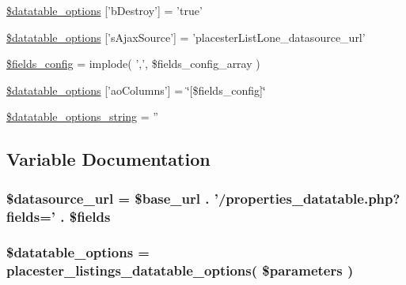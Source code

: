 \begin{DoxyCompactItemize}
\item 
\hyperlink{listings__list__lone__datatable_8php_aede299d9dc457bade42b03cb0e016767}{\$datatable\_\-options} \mbox{[}'bDestroy'\mbox{]} = 'true'
\item 
\hyperlink{listings__list__lone__datatable_8php_a44a3028e9b238ad6fa888ce5b1146630}{\$datatable\_\-options} \mbox{[}'sAjaxSource'\mbox{]} = 'placesterListLone\_\-datasource\_\-url'
\item 
\hyperlink{listings__list__lone__datatable_8php_aa814c93531f3211027d14b81e333f67e}{\$fields\_\-config} = implode( ',', \$fields\_\-config\_\-array )
\item 
\hyperlink{listings__list__lone__datatable_8php_a2022ba2609adb229b6169ded377ff005}{\$datatable\_\-options} \mbox{[}'aoColumns'\mbox{]} = \char`\"{}\mbox{[}\$fields\_\-config\mbox{]}\char`\"{}
\item 
\hyperlink{listings__list__lone__datatable_8php_ab74772b3fc544c34f500c3e0d8fd627e}{\$datatable\_\-options\_\-string} = ''
\end{DoxyCompactItemize}


\subsection{Variable Documentation}
\hypertarget{listings__list__lone__datatable_8php_a62dfabd516087facc1d5da1ea1ed007f}{
\subsubsection[{\$datasource\_\-url}]{\setlength{\rightskip}{0pt plus 5cm}\$datasource\_\-url = \$base\_\-url . '/properties\_\-datatable.php?fields=' . \$fields}}
\label{d5/d60/listings__list__lone__datatable_8php_a62dfabd516087facc1d5da1ea1ed007f}
\hypertarget{listings__list__lone__datatable_8php_ac481557faa1530c1ca3c5230aa250ca5}{
\subsubsection[{\$datatable\_\-options}]{\setlength{\rightskip}{0pt plus 5cm}\$datatable\_\-options = placester\_\-listings\_\-datatable\_\-options( \$parameters )}}
\label{d5/d60/listings__list__lone__datatable_8php_ac481557faa1530c1ca3c5230aa250ca5}


